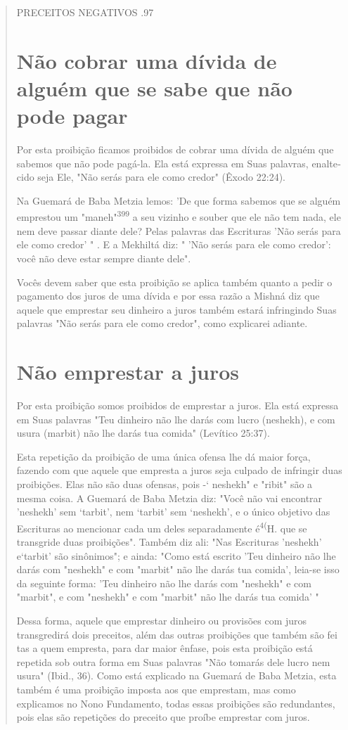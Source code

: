 \begin{quote}
PRECEITOS NEGATIVOS .97

\section{Não cobrar uma dívida de alguém que se sabe que não pode pagar}

Por esta proibição ficamos proibidos de cobrar uma dívida de alguém que
sabemos que não pode pagá-la. Ela está expressa em Suas palavras,
enalte­cido seja Ele, "Não serás para ele como credor" (Êxodo 22:24).

Na Guemará de Baba Metzia lemos: 'De que forma sabemos que se alguém
emprestou um "maneh"\textsuperscript{399} a seu vizinho e souber que ele
não tem na­da, ele nem deve passar diante dele? Pelas palavras das
Escrituras 'Não serás para ele como credor' " . E a Mekhiltá diz: " 'Não
serás para ele como credor': você não deve estar sempre diante dele".

Vocês devem saber que esta proibição se aplica também quanto a pedir o
pagamento dos juros de uma dívida e por essa razão a Mishná diz que
aquele que emprestar seu dinheiro a juros também estará infringindo Suas
pala­vras "Não serás para ele como credor", como explicarei adiante.

\section{Não emprestar a juros}

Por esta proibição somos proibidos de emprestar a juros. Ela está
expressa em Suas palavras "Teu dinheiro não lhe darás com lucro
(neshekh), e com usura (marbit) não lhe darás tua comida" (Levítico
25:37).

Esta repetição da proibição de uma única ofensa lhe dá maior força,
fazendo com que aquele que empresta a juros seja culpado de infringir
duas proibições. Elas não são duas ofensas, pois -` neshekh" e "ribit"
são a mesma coisa. A Guemará de Baba Metzia diz: "Você não vai encontrar
'neshekh' sem `tarbit', nem `tarbit' sem `neshekh', e o único objetivo
das Escrituras ao men­cionar cada um deles separadamente
é\textsuperscript{4(}H. que se transgride duas
proibições". Também diz ali: "Nas Escrituras 'neshekh' e`tarbit' são
sinônimos"; e ainda: "Como está escrito 'Teu dinheiro não lhe darás com
"neshekh" e com "mar­bit" não lhe darás tua comida', leia-se isso da
seguinte forma: 'Teu dinheiro não lhe darás com "neshekh" e com
"marbit", e com "neshekh" e com "mar­bit" não lhe darás tua comida' "

Dessa forma, aquele que emprestar dinheiro ou provisões com ju­ros
transgredirá dois preceitos, além das outras proibições que também são
fei tas a quem empresta, para dar maior ênfase, pois esta proibição está
repetida sob outra forma em Suas palavras "Não tomarás dele lucro nem
usura" (Ibid., 36). Como está explicado na Guemará de Baba Metzia, esta
também é uma proi­bição imposta aos que emprestam, mas como explicamos
no Nono Fundamen­to, todas essas proibições são redundantes, pois elas
são repetições do preceito que proíbe emprestar com juros.
\end{quote}

